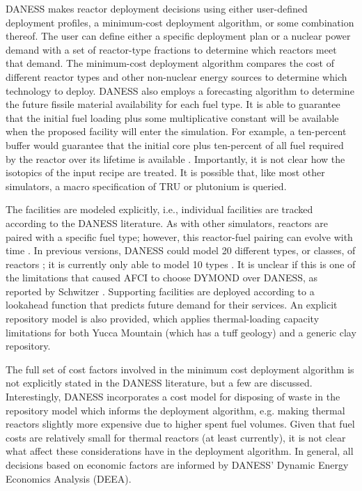 DANESS makes reactor deployment decisions using either user-defined deployment
profiles, a minimum-cost deployment algorithm, or some combination thereof. The
user can define either a specific deployment plan or a nuclear power demand with
a set of reactor-type fractions to determine which reactors meet that
demand. The minimum-cost deployment algorithm compares the cost of different
reactor types and other non-nuclear energy sources to determine which technology
to deploy. DANESS also employs a forecasting algorithm to determine the future
fissile material availability for each fuel type. It is able to guarantee that
the initial fuel loading plus some multiplicative constant will be available
when the proposed facility will enter the simulation. For example, a ten-percent
buffer would guarantee that the initial core plus ten-percent of all fuel
required by the reactor over its lifetime is available
\cite{guerin_benchmark_2009}. Importantly, it is not clear how the isotopics of
the input recipe are treated. It is possible that, like most other simulators, a
macro specification of TRU or plutonium is queried.

The facilities are modeled explicitly, i.e., individual facilities are tracked
according to the DANESS literature. As with other simulators, reactors are
paired with a specific fuel type; however, this reactor-fuel pairing can evolve
with time \cite{durpel_daness_2003}. In previous versions, DANESS could model 20
different types, or classes, of reactors \cite{van_den_durpel_daness_2009}; it
is currently only able to model 10 types \cite{durpel_daness_2003}. It is
unclear if this is one of the limitations that caused AFCI to choose DYMOND over
DANESS, as reported by Schwitzer \cite{schweitzer_improved_2008}. Supporting
facilities are deployed according to a lookahead function that predicts future
demand for their services. An explicit repository model is also provided, which
applies thermal-loading capacity limitations for both Yucca Mountain (which has
a tuff geology) and a generic clay repository.

The full set of cost factors involved in the minimum cost deployment algorithm
is not explicitly stated in the DANESS literature, but a few are
discussed. Interestingly, DANESS incorporates a cost model for disposing of
waste in the repository model which informs the deployment algorithm,
e.g. making thermal reactors slightly more expensive due to higher spent fuel
volumes. Given that fuel costs are relatively small for thermal reactors (at
least currently), it is not clear what affect these considerations have in the
deployment algorithm. In general, all decisions based on economic factors are
informed by DANESS' Dynamic Energy Economics Analysis (DEEA).

